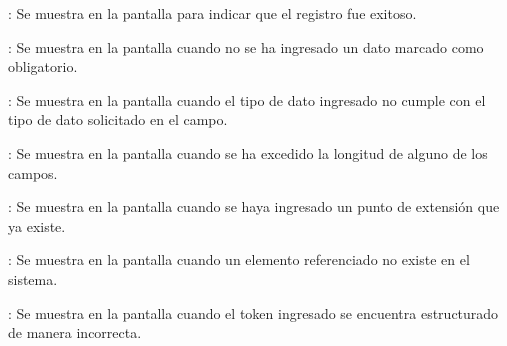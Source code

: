 \begin{Citemize}
	\item {}: Se muestra en la pantalla  para indicar que el registro fue exitoso.
	\item {}: Se muestra en la pantalla  cuando no se ha ingresado un dato marcado como obligatorio.
	\item {}: Se muestra en la pantalla  cuando el tipo de dato ingresado no cumple con el tipo de dato solicitado en el campo.
	\item {}: Se muestra en la pantalla  cuando se ha excedido la longitud de alguno de los campos.
	\item {}: Se muestra en la pantalla  cuando se haya ingresado un punto de extensión que ya existe.
	\item {}: Se muestra en la pantalla  cuando un elemento referenciado no existe en el sistema.
	\item {}: Se muestra en la pantalla  cuando el token ingresado se encuentra estructurado de manera incorrecta.
\end{Citemize}
